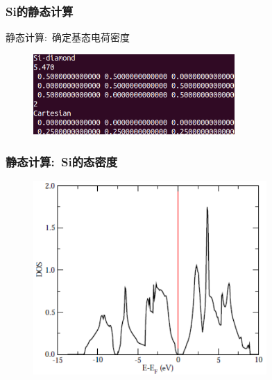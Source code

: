 {
	\frametitle{\textrm{Si}的静态计算}
静态计算:~确定基态电荷密度
\vskip 5pt
{\fontsize{8.5pt}{5.2pt}\selectfont{\textcolor{blue}{材料电子学性质计算的起点}}}
\begin{figure}[h!]
\centering
\includegraphics[height=1.2in,viewport=0 0 370 150,clip]{Figures/Si_POSCAR.png}
\caption{\fontsize{6.2pt}{5.2pt}}%
\label{Si_POSCAR}
\end{figure}
{\fontsize{7.2pt}{5.2pt}}%
\vskip 6pt
{\fontsize{8.5pt}{5.2pt}}
}

\frame
{
	\frametitle{静态计算:~\textrm{Si}的态密度}
\vspace*{-10pt}
\begin{figure}[h!]
\centering
\includegraphics[width=3.5in]{Figures/VASP_cdSi_1.png}
\label{Fig:VASP-Si_DOS}
\end{figure}
}

